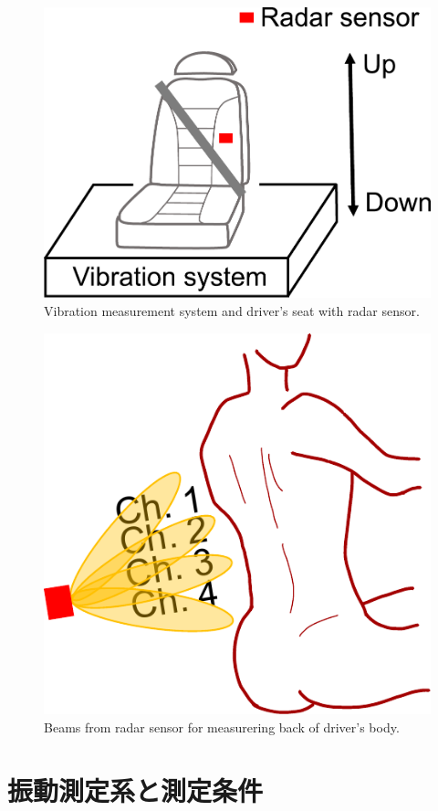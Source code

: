 \documentclass[11pt]{jarticle}
\begin{document}
\begin{figure}[tb]
  \centering
  \includegraphics[width=0.7\columnwidth]{sensorstructure.pdf}
  \caption{Vibration measurement system and driver's seat with radar sensor.}
  \label{fig:sensorstructure}
\end{figure}

\begin{figure}[tb]
  \centering
  \includegraphics[width=0.4\columnwidth]{sensorimg.pdf}
  \caption{Beams from radar sensor for measurering back of driver's body.}
  \label{fig:sensorimg}
\end{figure}


\section{振動測定系と測定条件}
\hspace{1.0em}
\end{document}
